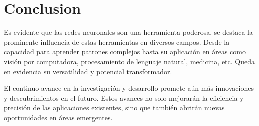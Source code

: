 \documentclass[runningheads]{llncs} %
\begin{document}
\newpage
\section{Conclusion}
Es evidente que las redes neuronales son una herramienta poderosa, se destaca 
la prominente influencia de estas herramientas en diversos campos. 
Desde la capacidad para aprender patrones complejos  hasta su aplicación en áreas 
como visión por computadora, procesamiento de lenguaje natural, medicina, etc.
Queda en evidencia su versatilidad y potencial transformador.

El continuo avance en la investigación y desarrollo promete aún más innovaciones y 
descubrimientos en el futuro. Estos avances no solo mejorarán la eficiencia y precisión 
de las aplicaciones existentes, sino que también abrirán nuevas oportunidades 
en áreas emergentes.
\newpage
\printbibliography
\end{document}

